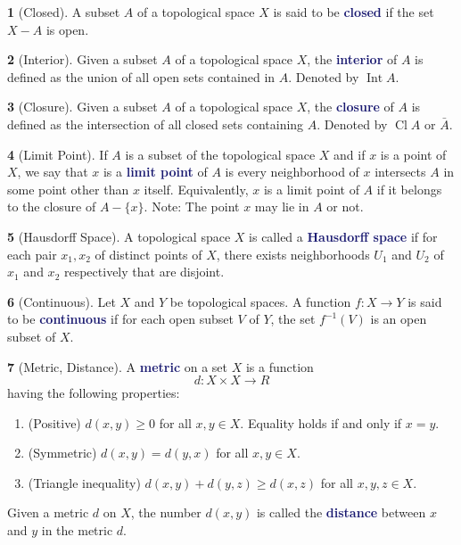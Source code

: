 \documentclass[12pt]{article}
\newcommand{\navy}[1]{\textcolor{MidnightBlue}{\bf #1}}
\theoremstyle{plain}
\theoremstyle{definition}
\newtheorem{definition}{\color{MidnightBlue}{\textbf{Definition}}}[section]
\newcommand{\1}{\mathbbm 1}
\DeclareMathOperator{\Int}{Int}
\DeclareMathOperator{\Cl}{Cl}
\begin{document}
\begin{definition}[Closed]
A subset $A$ of a topological space $X$ is said to be \navy{closed} if the set $X - A$ is open.
\end{definition}

\begin{definition}[Interior]
Given a subset $A$ of a topological space $X$, the \navy{interior} of $A$ is defined as the union of all open sets contained in $A$. Denoted by $\Int A$.
\end{definition}

\begin{definition}[Closure]
Given a subset $A$ of a topological space $X$, the \navy{closure} of $A$ is defined as the intersection of all closed sets containing $A$. Denoted by $\Cl A$ or $\bar{A}$.
\end{definition}

\begin{definition}[Limit Point]
If $A$ is a subset of the topological space $X$ and if $x$ is a point of $X$, we say that $x$ is a \navy{limit point} of $A$ is every neighborhood of $x$ intersects $A$ in some point other than $x$ itself. Equivalently, $x$ is a limit point of $A$ if it belongs to the closure of $A - \{x\}$. Note: The point $x$ may lie in $A$ or not.
\end{definition}

\begin{definition}[Hausdorff Space]
A topological space $X$ is called a \navy{Hausdorff space} if for each pair $x_1, x_2$ of distinct points of $X$, there exists neighborhoods $U_1$ and $U_2$ of $x_1$ and $x_2$ respectively that are disjoint.
\end{definition}

\begin{definition}[Continuous]
Let $X$ and $Y$ be topological spaces. A function $f : X \to Y$ is said to be \navy{continuous} if for each open subset $V$ of $Y$, the set $f^{-1}(V)$ is an open subset of $X$.
\end{definition}

\begin{definition}[Metric, Distance]
A \navy{metric} on a set $X$ is a function
\begin{equation}
d : X \times X \to R
\end{equation}
having the following properties:
\begin{enumerate}
\item (Positive) $d(x,y) \geq 0$ for all $x,y \in X$. Equality holds if and only if $x=y$.
\item (Symmetric) $d(x,y) = d(y,x)$ for all $x,y \in X$.
\item (Triangle inequality) $d(x,y) + d(y,z) \geq d(x,z)$ for all $x,y,z \in X$.
\end{enumerate}
Given a metric $d$ on $X$, the number $d(x,y)$ is called the \navy{distance} between $x$ and $y$ in the metric $d$.
\end{definition}
\end{document}
